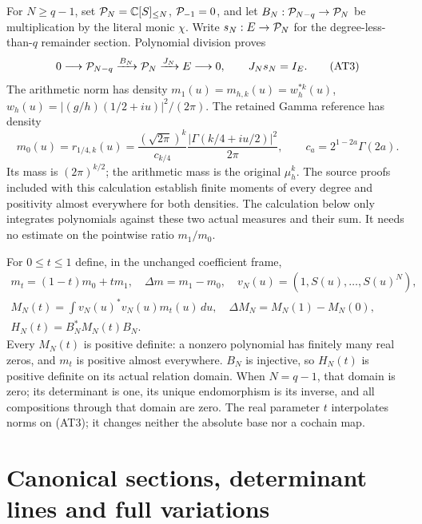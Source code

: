 For $N\ge q-1$, set $\mathcal P_N=\mathbb C[S]_{\le N}$,
$\mathcal P_{-1}=0$, and let
$B_N:\mathcal P_{N-q}\to\mathcal P_N$ be multiplication by the literal monic
$\chi$. Write $s_N:E\to\mathcal P_N$ for the degree-less-than-$q$
remainder section. Polynomial division proves
\[
 0\longrightarrow\mathcal P_{N-q}\xrightarrow{B_N}\mathcal P_N
       \xrightarrow{J_N}E\longrightarrow0,
 \qquad J_Ns_N=I_E.                         \tag{AT3}
\]
The arithmetic norm has density
$m_1(u)=m_{h,k}(u)=w_h^{*k}(u)$,
$w_h(u)=|(g/h)(1/2+iu)|^2/(2\pi)$.
The retained Gamma reference has density
\[
 m_0(u)=r_{1/4,k}(u)
 =\frac{(\sqrt{2\pi})^k}{c_{k/4}}
       \frac{|\Gamma(k/4+iu/2)|^2}{2\pi},
 \qquad c_a=2^{1-2a}\Gamma(2a).              \tag{AT4}
\]
Its mass is $(2\pi)^{k/2}$; the arithmetic mass is the original
$\mu_h^k$. The source proofs included with this calculation establish
finite moments of every degree and positivity almost everywhere for
both densities. The calculation below only integrates polynomials
against these two actual measures and their sum. It needs no estimate
on the pointwise ratio $m_1/m_0$.

For $0\le t\le1$ define, in the unchanged coefficient frame,
\[
 \begin{gathered}
 m_t=(1-t)m_0+tm_1,\quad \Delta m=m_1-m_0,
 \quad v_N(u)=(1,S(u),\ldots,S(u)^N),\\
 M_N(t)=\int v_N(u)^*v_N(u)m_t(u)\,du,
 \quad \Delta M_N=M_N(1)-M_N(0),\\
 H_N(t)=B_N^*M_N(t)B_N.                     \end{gathered}
 \tag{AT5}
\]
Every $M_N(t)$ is positive definite: a nonzero polynomial has finitely
many real zeros, and $m_t$ is positive almost everywhere. $B_N$ is
injective, so $H_N(t)$ is positive definite on its actual relation
domain. When $N=q-1$, that domain is zero; its determinant is one,
its unique endomorphism is its inverse, and all compositions through
that domain are zero. The real parameter $t$ interpolates norms on
(AT3); it changes neither the absolute base nor a cochain map.

\section{Canonical sections, determinant lines and full variations}


